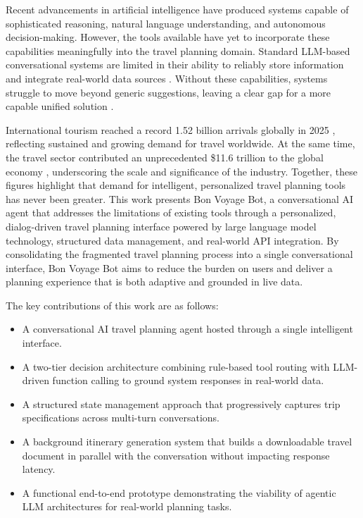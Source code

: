 \documentclass{article}
\begin{document}
Recent advancements in artificial intelligence have produced systems capable of sophisticated reasoning, natural language understanding, and autonomous decision-making. However, the tools available have yet to incorporate these capabilities meaningfully into the travel planning domain. Standard LLM-based conversational systems are limited in their ability to reliably store information and integrate real-world data sources \citep{schick2023toolformer}. Without these capabilities, systems struggle to move beyond generic suggestions, leaving a clear gap for a more capable unified solution \citep{shivakumar2025}.

International tourism reached a record 1.52 billion arrivals globally in 2025 \citep{unwto2026}, reflecting sustained and growing demand for travel worldwide. At the same time, the travel sector contributed an unprecedented \$11.6 trillion to the global economy \citep{wttc2025}, underscoring the scale and significance of the industry. Together, these figures highlight that demand for intelligent, personalized travel planning tools has never been greater. This work presents Bon Voyage Bot, a conversational AI agent that addresses the limitations of existing tools through a personalized, dialog-driven travel planning interface powered by large language model technology, structured data management, and real-world API integration. By consolidating the fragmented travel planning process into a single conversational interface, Bon Voyage Bot aims to reduce the burden on users and deliver a planning experience that is both adaptive and grounded in live data.  

The key contributions of this work are as follows:
\begin{itemize}[noitemsep, topsep=0pt]
    \item A conversational AI travel planning agent hosted through a single intelligent interface.
    \item A two-tier decision architecture combining rule-based tool routing with LLM-driven function calling to ground system responses in real-world data.
    \item A structured state management approach that progressively captures trip specifications across multi-turn conversations.
    \item A background itinerary generation system that builds a downloadable travel document in parallel with the conversation without impacting response latency.
    \item A functional end-to-end prototype demonstrating the viability of agentic LLM architectures for real-world planning tasks.
\end{itemize}
\end{document}
